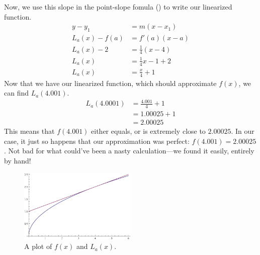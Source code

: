 \begin{ex}
\begin{sol}
    Now, we use this slope in the point-slope fomula () to write our linearized function.
    \begin{align*}
      y-y_1 &= m (x-x_1) \\
      L_a(x)-f(a) &= f'(a) (x-a) \\
      L_a(x)-2 &= \frac{1}{4}(x-4) \\
      L_a(x) &= \frac{1}{4}x-1+2 \\
      L_a(x)&= \frac{x}{4}+1
    \end{align*}
    Now that we have our linearized function, which should approximate $f(x)$, we can find $L_a (4.001)$.
    \begin{align*}
      L_a(4.0001) &= \frac{4.001}{4}+1 \\
      &= 1.00025 +1 \\
      &= 2.00025
    \end{align*}
    This means that $f(4.001)$ either equals, or is extremely close to $2.00025$.
    In our case, it just so happens that our approximation was perfect: $f(4.001)=2.00025$.
    Not bad for what could've been a nasty calculation---we found it easily, entirely by hand!
    \begin{figure}[h]
      \begin{center}
        \includegraphics[width=0.5\textwidth]{continuous/derivatives/lin_ex1.eps}
      \end{center}
      \caption{A plot of $f(x)$ and $L_a(x)$.}
    \end{figure}
  \end{sol}
\end{ex}

